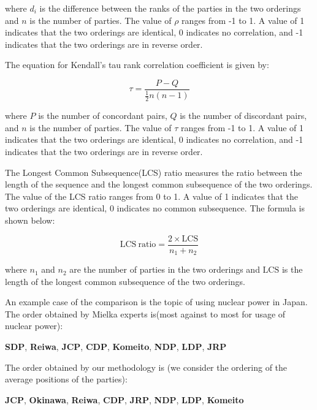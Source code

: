 \documentclass[final,5p,times,twocolumn,authoryear]{elsarticle}
\begin{document}
where $d_i$ is the difference between the ranks of the parties in the two orderings and $n$ is the number of parties. The value of $\rho$ ranges from -1 to 1. A value of 1 indicates that the two orderings are identical, 0 indicates no correlation, and -1 indicates that the two orderings are in reverse order. 

The equation for Kendall's tau rank correlation coefficient is given by:

\begin{center}
	\[	\tau = \frac{P-Q}{\frac{1}{2}n(n-1)} \]
\end{center}

where $P$ is the number of concordant pairs, $Q$ is the number of discordant pairs, and $n$ is the number of parties. The value of $\tau$ ranges from -1 to 1. A value of 1 indicates that the two orderings are identical, 0 indicates no correlation, and -1 indicates that the two orderings are in reverse order.

The Longest Common Subsequence(LCS) ratio measures the ratio between the length of the sequence and the longest common subsequence of the two orderings. The value of the LCS ratio ranges from 0 to 1. A value of 1 indicates that the two orderings are identical, 0 indicates no common subsequence. The formula is shown below:
\begin{center}
  \[	\mathrm{LCS\ ratio} = \frac{2 \times \mathrm{LCS}}{n_1 + n_2} \]
\end{center}

where $n_1$ and $n_2$ are the number of parties in the two orderings and $\mathrm{LCS}$ is the length of the longest common subsequence of the two orderings.

An example case of the comparison is the topic of using nuclear power in Japan. The order obtained by Mielka experts is(most against to most for usage of nuclear power):
\begin{center}
\textbf{SDP}, \textbf{Reiwa}, \textbf{JCP}, \textbf{CDP}, \textbf{Komeito}, \textbf{NDP}, \textbf{LDP}, \textbf{JRP}
\end{center}

The order obtained by our methodology is (we consider the ordering of the average positions of the parties):

\begin{center}
	\textbf{JCP}, \textbf{Okinawa}, \textbf{Reiwa}, \textbf{CDP}, \textbf{JRP}, \textbf{NDP}, \textbf{LDP}, \textbf{Komeito}
\end{center}
\end{document}
